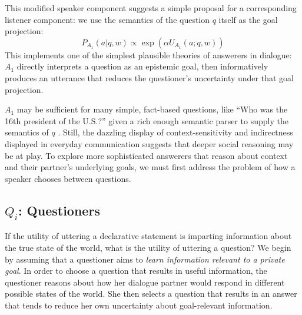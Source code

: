 \documentclass[12pt, floatsintext, jou]{apa6}
\begin{document}
This modified speaker component suggests a simple proposal for a corresponding listener component: we use the semantics of the question $q$ itself as the goal projection:
$$P_{A_1}(a|q,w) \propto \exp(\alpha U_{A_1}(a; q,w))$$
This implements one of the simplest plausible theories of answerers in dialogue: $A_1$ directly interprets a question as an epistemic goal, then informatively produces an utterance that reduces the questioner's uncertainty under that goal projection. 

$A_1$ may be sufficient for many simple, fact-based questions, like ``Who was the 16th president of the U.S.?'' given a rich enough semantic parser to supply the semantics of $q$ \cite{BerantChouFrostigLiang13_FreebaseQAPairs}. Still, the dazzling display of context-sensitivity and indirectness displayed in everyday communication suggests that deeper social reasoning may be at play. To explore more sophisticated answerers that reason about context and their partner's underlying goals, we must first address the problem of how a speaker chooses between questions.

\subsection{$Q_i$: Questioners}

If the utility of uttering a declarative statement is imparting information about the true state of the world, what is the utility of uttering a question? We begin by assuming that a questioner aims to \emph{learn information relevant to a private goal}.
%
In order to choose a question that results in useful information, the questioner reasons about how her dialogue partner would respond in different possible states of the world. She then selects a question that results in an answer that tends to reduce her own uncertainty about goal-relevant information.
%

\end{document}
